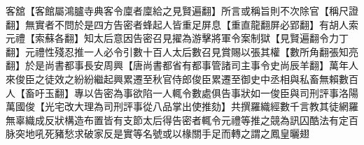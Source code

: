 客舘【客館屬鴻臚寺典客令廩者廩給之見賢遍翻】所言或稱旨則不次除官【稱尺證翻】無實者不問於是四方告密者蜂起人皆重足屏息【重直龍翻屏必郢翻】有胡人索元禮【索蘇各翻】知太后意因告密召見擢為游擊將軍令案制獄【見賢遍翻令力丁翻】元禮性殘忍推一人必令引數十百人太后數召見賞賜以張其權【數所角翻張知亮翻】於是尚書都事長安周興【唐尚書都省有都事管諸司主事令史尚辰羊翻】萬年人來俊臣之徒效之紛紛繼起興累遷至秋官侍郎俊臣累遷至御史中丞相與私畜無賴數百人【畜吁玉翻】專以告密為事欲陷一人輒令數處俱告事狀如一俊臣與司刑評事洛陽萬國俊【光宅改大理為司刑評事從八品掌出使推劾】共撰羅織經數千言教其徒網羅無辜織成反狀構造布置皆有支節太后得告密者輒令元禮等推之競為訊囚酷法有定百脉突地吼死豬愁求破家反是實等名號或以椽關手足而轉之謂之鳳皇曬翅